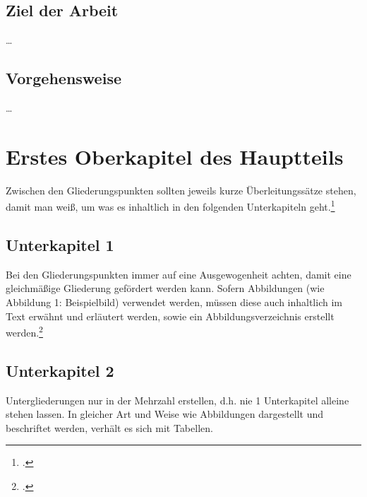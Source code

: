 \documentclass[12pt,toc=bib,toc=listof]{scrreprt}
\begin{document}

\section{Ziel der Arbeit} %
\label{sec:ziel_der_arbeit}

\ldots


\section{Vorgehensweise} %
\label{sec:vorgehensweise}

\ldots


\chapter{Erstes Oberkapitel des Hauptteils} %
\label{sec:ersteskapitel}

Zwischen den Gliederungspunkten sollten jeweils kurze Überleitungssätze stehen, damit man weiß, um was es inhaltlich in den folgenden Unterkapiteln geht.\footcite [Vgl.] []{GPL}


\section{Unterkapitel 1} %
\label{sec:unterkapitel1}

Bei den Gliederungspunkten immer auf eine Ausgewogenheit achten, damit eine gleichmäßige Gliederung gefördert werden kann. Sofern Abbildungen (wie Abbildung 1: Beispielbild) verwendet werden, müssen diese auch inhaltlich im Text erwähnt und erläutert werden, sowie ein Abbildungsverzeichnis erstellt werden.\footcite [Vgl.] [] {hhnwin}


\section{Unterkapitel 2} %
\label{sec:unterkapitel2}

Untergliederungen nur in der Mehrzahl erstellen, d.h. nie 1 Unterkapitel alleine stehen lassen.
In gleicher Art und Weise wie Abbildungen dargestellt und beschriftet werden, verhält es sich mit Tabellen.
\end{document}
